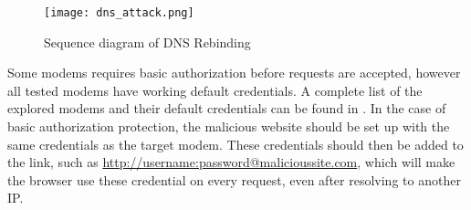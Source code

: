 \begin{figure}
  \texttt{[image: dns\_attack.png]}
  \caption{Sequence diagram of DNS Rebinding}
  \label{fig:dns_attack}
\end{figure}

Some modems requires basic authorization before requests are accepted, however all tested modems have working default credentials.
A complete list of the explored modems and their default credentials can be found in .
In the case of basic authorization protection, the malicious website should be set up with the same credentials as the target modem.
These credentials should then be added to the link, such as \url{http://username:password@malicioussite.com}, which will make the browser use these credential on every request, even after resolving to another IP.